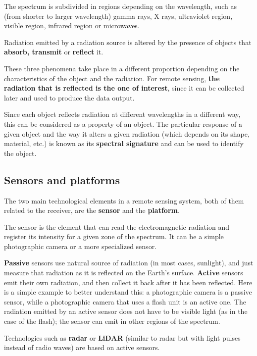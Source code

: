 The spectrum is subdivided in regions depending on the wavelength, such as (from shorter to larger wavelength) gamma rays, X rays, ultraviolet region, visible region, infrared region or microwaves.


Radiation emitted by a radiation source is altered by the presence of objects that \textbf{absorb, transmit} or \textbf{reflect} it.

These three phenomena take place in a different proportion depending on the characteristics of the object and the radiation. For remote sensing, \textbf{the radiation that is reflected is the one of interest}, since it can be collected later and used to produce the data output.

Since each object reflects radiation at different wavelengths in a different way, this can be considered as a property of an object. The particular response of a given object and the way it alters a given radiation (which depends on its shape, material, etc.) is known as its \textbf{spectral signature} and can be used to identify the object.


\subsection{Sensors and platforms}

The two main technological elements in a remote sensing system, both of them related to the receiver, are the \textbf{sensor} and the \textbf{platform}.

The sensor is the element that can read the electromagnetic radiation and register its intensity for a given zone of the spectrum. It can be a simple photographic camera or a more specialized sensor.

\textbf{Passive} sensors use natural source of radiation (in most cases, sunlight), and just measure that radiation as it is reflected on the Earth's surface. \textbf{Active} sensors emit their own radiation, and then collect it back after it has been reflected. Here is a simple example to better understand this: a photographic camera is a passive sensor, while a photographic camera that uses a flash unit is an active one. The radiation emitted by an active sensor does not have to be visible light (as in the case of the flash); the sensor can emit in other regions of the spectrum.

Technologies such as \textbf{radar} or \textbf{LiDAR} (similar to radar but with light pulses instead of radio waves) are based on active sensors.

